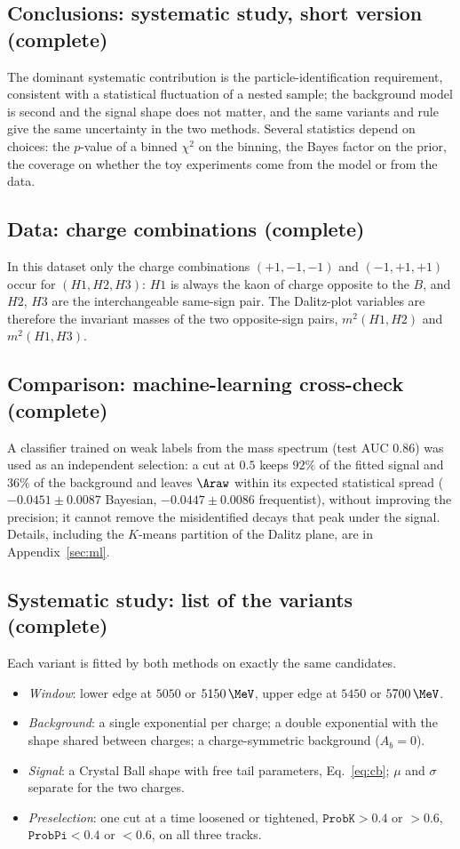 \subsection{Conclusions: systematic study, short version (complete)}
The dominant systematic contribution is the particle-identification requirement, consistent with a statistical fluctuation of a nested sample; the background model is second and the signal shape does not matter, and the same variants and rule give the same uncertainty in the two methods. Several statistics depend on choices: the $p$-value of a binned $\chi^2$ on the binning, the Bayes factor on the prior, the coverage on whether the toy experiments come from the model or from the data.

\subsection{Data: charge combinations (complete)}
In this dataset only the charge combinations $(+1,-1,-1)$ and $(-1,+1,+1)$ occur for $(H1,H2,H3)$: $H1$ is always the kaon of charge opposite to the $B$, and $H2$, $H3$ are the interchangeable same-sign pair. The Dalitz-plot variables are therefore the invariant masses of the two opposite-sign pairs, $m^2(H1,H2)$ and $m^2(H1,H3)$.

\subsection{Comparison: machine-learning cross-check (complete)}
A classifier trained on weak labels from the mass spectrum (test AUC $0.86$) was used as an independent selection: a cut at $0.5$ keeps $92\%$ of the fitted signal and $36\%$ of the background and leaves $\Araw$ within its expected statistical spread ($-0.0451\pm0.0087$ Bayesian, $-0.0447\pm0.0086$ frequentist), without improving the precision; it cannot remove the misidentified decays that peak under the signal. Details, including the $K$-means partition of the Dalitz plane, are in Appendix~\ref{sec:ml}.

\subsection{Systematic study: list of the variants (complete)}
Each variant is fitted by both methods on exactly the same candidates.
\begin{itemize}[leftmargin=*,itemsep=1pt]
\item \emph{Window}: lower edge at $5050$ or $5150\,\MeV$, upper edge at $5450$ or $5700\,\MeV$.
\item \emph{Background}: a single exponential per charge; a double exponential with the shape shared between charges; a charge-symmetric background ($A_b=0$).
\item \emph{Signal}: a Crystal Ball shape with free tail parameters, Eq.~\eqref{eq:cb}; $\mu$ and $\sigma$ separate for the two charges.
\item \emph{Preselection}: one cut at a time loosened or tightened, $\texttt{ProbK}>0.4$ or $>0.6$, $\texttt{ProbPi}<0.4$ or $<0.6$, on all three tracks.
\end{itemize}

